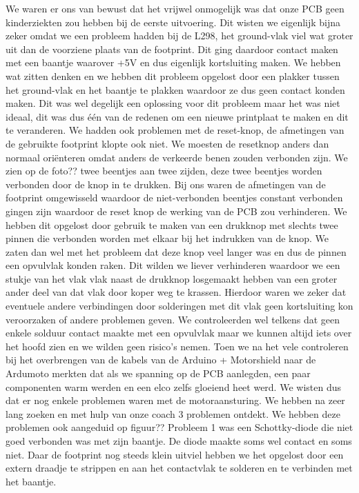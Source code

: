 We waren er ons van bewust dat het vrijwel onmogelijk was dat onze PCB geen kinderziekten zou hebben bij de eerste uitvoering. Dit wisten we eigenlijk bijna zeker omdat we een probleem hadden bij de L298, het ground-vlak viel wat groter uit dan de voorziene plaats van de footprint. Dit ging daardoor contact maken met een baantje waarover +5V en dus eigenlijk kortsluiting maken. We hebben wat zitten denken en we hebben dit probleem opgelost door een plakker tussen het ground-vlak en het baantje te plakken waardoor ze dus geen contact konden maken. Dit was wel degelijk een oplossing voor dit probleem maar het was niet ideaal, dit was dus één van de redenen om een nieuwe printplaat te maken en dit te veranderen. We hadden ook problemen met de reset-knop, de afmetingen van de gebruikte footprint klopte ook niet. We moesten de resetknop anders dan normaal oriënteren omdat anders de verkeerde benen zouden verbonden zijn. We zien op de foto??%
twee beentjes aan twee zijden, deze twee beentjes worden verbonden door de knop in te drukken. Bij ons waren de afmetingen van de footprint omgewisseld waardoor de niet-verbonden beentjes constant verbonden gingen zijn waardoor de reset knop de werking van de PCB zou verhinderen. We hebben dit opgelost door gebruik te maken van een drukknop met slechts twee pinnen die verbonden worden met elkaar bij het indrukken van de knop. We zaten dan wel met het probleem dat deze knop veel langer was en dus de pinnen een opvulvlak konden raken. Dit wilden we liever verhinderen waardoor we een stukje van het vlak vlak naast de drukknop losgemaakt hebben van een groter ander deel van dat vlak door koper weg te krassen. Hierdoor waren we zeker dat eventuele andere verbindingen door solderingen met dit vlak geen kortsluiting kon veroorzaken of andere problemen geven. We controleerden wel telkens dat geen enkele solduur contact maakte met een opvulvlak maar we kunnen altijd iets over het hoofd zien en we wilden geen risico’s nemen. Toen we na het vele controleren bij het overbrengen van de kabels van de Arduino + Motorshield naar de Ardumoto merkten dat als we spanning op de PCB aanlegden, een paar componenten warm werden en een elco zelfs gloeiend heet werd. We wisten dus dat er nog enkele problemen waren met de motoraansturing. We hebben na zeer lang zoeken en met hulp van onze coach 3 problemen ontdekt. We hebben deze problemen ook aangeduid op figuur??%
Probleem 1 was een Schottky-diode die niet goed verbonden was met zijn baantje. De diode maakte soms wel contact en soms niet. Daar de footprint nog steeds klein uitviel hebben we het opgelost door een extern draadje te strippen en aan het contactvlak te solderen en te verbinden met het baantje.
